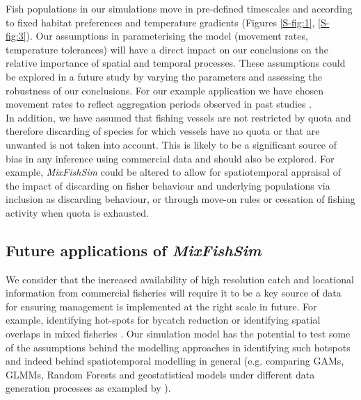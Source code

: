 \documentclass[review]{elsarticle}
\begin{document}
Fish populations in our simulations move in pre-defined timescales and
according to fixed habitat preferences and temperature gradients (Figures
\ref{S-fig:1}, \ref{S-fig:3}). Our assumptions in parameterising the model
(movement rates, temperature tolerances) will have a direct impact on our
conclusions on the relative importance of spatial and temporal processes. These
assumptions could be explored in a future study by varying the parameters and
assessing the robustness of our conclusions. For our example application we
have chosen movement rates to reflect aggregation periods observed in past
studies \citep{Poos2007}. \\

In addition, we have assumed that fishing vessels are not restricted by quota
and therefore discarding of species for which vessels have no quota or that are
unwanted is not taken into account. This is likely to be a significant source
of bias in any inference using commercial data and should also be explored. For
example, \textit{MixFishSim} could be altered to allow for spatiotemporal
appraisal of the impact of discarding on fisher behaviour and underlying
populations via inclusion as discarding behaviour, or through move-on rules or
cessation of fishing activity when quota is exhausted. \\

\subsection{Future applications of \textit{MixFishSim}}

We consider that the increased availability of high resolution catch and
locational information from commercial fisheries will require it to be a key
source of data for ensuring management is implemented at the right scale in
future. For example, identifying hot-spots for bycatch reduction or identifying
spatial overlaps in mixed fisheries \citep{Dolder2018, Gardner2008, Little2014,
	Dedman2015, Ward2015}. Our simulation model has the potential to test
some of the assumptions behind the modelling approaches in identifying such
hotspots and indeed behind spatiotemporal modelling in general (e.g. comparing
GAMs, GLMMs, Random Forests and geostatistical models under different data
generation processes as exampled by \cite{Stock2019}). \\
\end{document}
